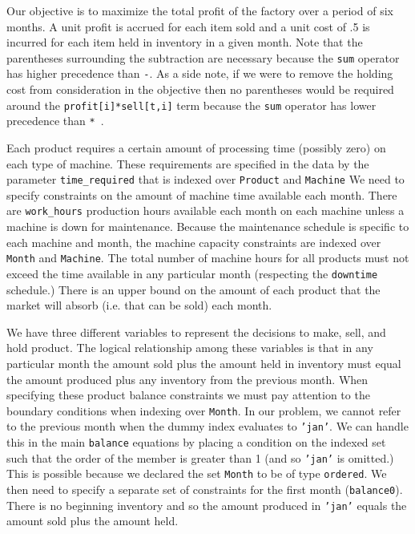 Our objective is to maximize the total profit of the factory over a period of six months.
A unit profit is accrued for each item sold and a unit cost of .5 is incurred for each item
held in inventory in a given month.
Note that the parentheses surrounding the subtraction
are necessary because the \texttt{sum} operator has higher precedence than \texttt{-}.
As a side note, if we were to remove the holding cost from consideration in 
the objective then no parentheses would be required around the
\texttt{profit[i]*sell[t,i]} term because the \texttt{sum} operator has lower precedence
than \texttt{*}~\cite{fourer:2003}. 

Each product requires a certain amount of processing time (possibly zero) on each type
of machine. These requirements are specified in the data by the parameter 
\texttt{time\_required} that is indexed over \texttt{Product} and \texttt{Machine}
We need to specify constraints on the amount of machine time
available each month. There are \texttt{work\_hours} production hours available each month
on each machine unless a machine is down for maintenance. Because the maintenance
schedule is specific to each machine and month, the machine capacity constraints 
are indexed over \texttt{Month} and \texttt{Machine}. The total number of machine
hours for all products must not exceed the time available in any particular month
(respecting the \texttt{downtime} schedule.)
There is an upper bound on the amount of each product that the market will absorb
(i.e. that can be sold) each month.

We have three different variables to represent the decisions to make, sell,
and hold product.  The logical relationship among these variables is that
in any particular month the amount sold plus the amount held in inventory
must equal the amount produced plus any inventory from the previous month.
When specifying these product balance constraints we must pay attention to the
boundary conditions when indexing over \texttt{Month}. In our problem, we
cannot refer to the previous month when the dummy index evaluates to \texttt{'jan'}.
We can handle this in the main \texttt{balance} equations by placing a condition
on the indexed set such that the order of the member is greater than 1
(and so \texttt{'jan'} is omitted.)
This is possible because we declared the set \texttt{Month} to be of type
\texttt{ordered}. We then need to specify a separate set of constraints for
the first month (\texttt{balance0}). There is no beginning inventory and 
so the amount produced in \texttt{'jan'} equals the amount sold plus the amount
held.

